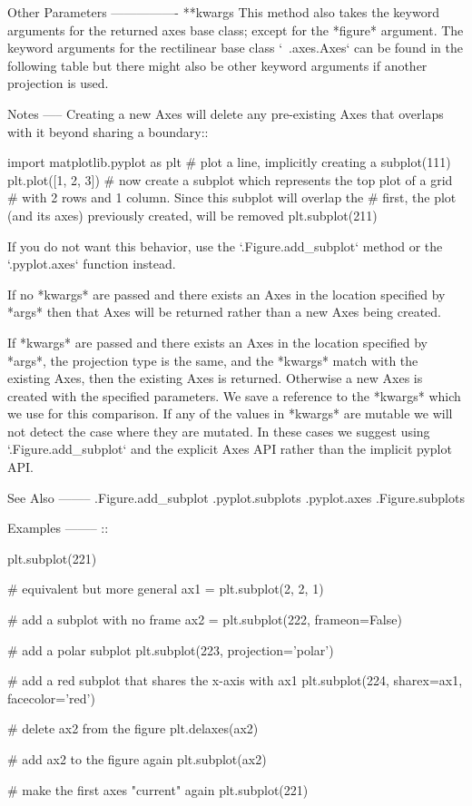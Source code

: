 \begin{DoxyVerb}
Other Parameters
----------------
**kwargs
    This method also takes the keyword arguments for the returned axes
    base class; except for the *figure* argument. The keyword arguments
    for the rectilinear base class `~.axes.Axes` can be found in
    the following table but there might also be other keyword
    arguments if another projection is used.


Notes
-----
Creating a new Axes will delete any pre-existing Axes that
overlaps with it beyond sharing a boundary::

    import matplotlib.pyplot as plt
    # plot a line, implicitly creating a subplot(111)
    plt.plot([1, 2, 3])
    # now create a subplot which represents the top plot of a grid
    # with 2 rows and 1 column. Since this subplot will overlap the
    # first, the plot (and its axes) previously created, will be removed
    plt.subplot(211)

If you do not want this behavior, use the `.Figure.add_subplot` method
or the `.pyplot.axes` function instead.

If no *kwargs* are passed and there exists an Axes in the location
specified by *args* then that Axes will be returned rather than a new
Axes being created.

If *kwargs* are passed and there exists an Axes in the location
specified by *args*, the projection type is the same, and the
*kwargs* match with the existing Axes, then the existing Axes is
returned.  Otherwise a new Axes is created with the specified
parameters.  We save a reference to the *kwargs* which we use
for this comparison.  If any of the values in *kwargs* are
mutable we will not detect the case where they are mutated.
In these cases we suggest using `.Figure.add_subplot` and the
explicit Axes API rather than the implicit pyplot API.

See Also
--------
.Figure.add_subplot
.pyplot.subplots
.pyplot.axes
.Figure.subplots

Examples
--------
::

    plt.subplot(221)

    # equivalent but more general
    ax1 = plt.subplot(2, 2, 1)

    # add a subplot with no frame
    ax2 = plt.subplot(222, frameon=False)

    # add a polar subplot
    plt.subplot(223, projection='polar')

    # add a red subplot that shares the x-axis with ax1
    plt.subplot(224, sharex=ax1, facecolor='red')

    # delete ax2 from the figure
    plt.delaxes(ax2)

    # add ax2 to the figure again
    plt.subplot(ax2)

    # make the first axes "current" again
    plt.subplot(221)\end{DoxyVerb}
 \mbox{\label{namespacematplotlib_1_1pyplot_ad54c5a7bb02f4bee37a873720b14884a}} 
